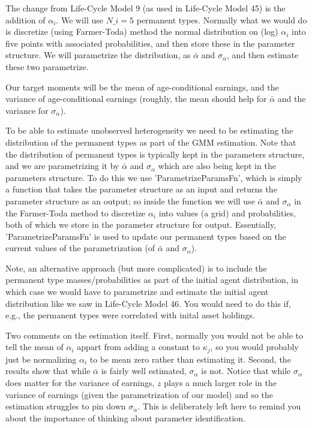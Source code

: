 The change from Life-Cycle Model 9 (as used in Life-Cycle Model 45) is the addition of $\alpha_i$. We will use $N\_{}i=5$ permanent types. Normally what we would do is discretize (using Farmer-Toda) method the normal distribution on (log) $\alpha_i$ into five points with associated probabilities, and then store these in the parameter structure. We will parametrize the distribution, as $\bar{\alpha}$ and $\sigma_{\alpha}$, and then estimate these two parametrize.

Our target moments will be the mean of age-conditional earnings, and the variance of age-conditional earnings (roughly, the mean should help for $\bar{\alpha}$ and the variance for $\sigma_{\alpha}$).

To be able to estimate unobserved heterogeneity we need to be estimating the distribution of the permanent types as part of the GMM estimation. Note that the distribution of permanent types is typically kept in the parameters structure, and we are parametrizing it by $\bar{\alpha}$ and $\sigma_{\alpha}$ which are also being kept in the parameters structure. To do this we use 'ParametrizeParamsFn', which is simply a function that takes the parameter structure as an input and returns the parameter structure as an output; so inside the function we will use $\bar{\alpha}$ and $\sigma_{\alpha}$ in the Farmer-Toda method to discretize $\alpha_i$ into values (a grid) and probabilities, both of which we store in the parameter structure for output. Essentially, 'ParametrizeParamsFn' is used to update our permanent types based on the current values of the parametrization (of $\bar{\alpha}$ and $\sigma_{\alpha}$).

Note, an alternative approach (but more complicated) is to include the permanent type masses/probabilities as part of the initial agent distribution, in which case we would have to parametrize and estimate the initial agent distribution like we saw in Life-Cycle Model 46. You would need to do this if, e.g., the permanent types were correlated with inital asset holdings.

Two comments on the estimation itself. First, normally you would not be able to tell the mean of $\alpha_i$ appart from adding a constant to $\kappa_j$, so you would probably just be normalizing $\alpha_i$ to be mean zero rather than estimating it. Second, the results show that while $\bar{\alpha}$ is fairly well estimated, $\sigma_{\alpha}$ is not. Notice that while $\sigma_{\alpha}$ does matter for the variance of earnings, $z$ plays a much larger role in the variance of earnings (given the parametrization of our model) and so the estimation struggles to pin down $\sigma_{\alpha}$. This is deliberately left here to remind you about the importance of thinking about parameter identification.


